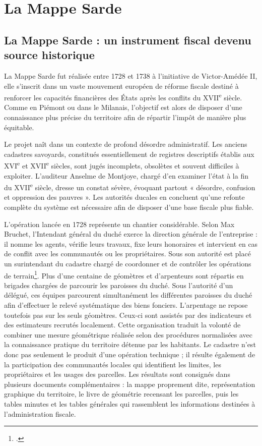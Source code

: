\documentclass[12pt,a4paper]{report}
\begin{document}
\section {La Mappe Sarde}


\subsection{La Mappe Sarde : un instrument fiscal devenu source historique}

La Mappe Sarde fut réalisée entre 1728 et 1738 à l'initiative de Victor-Amédée II, elle s'inscrit dans un vaste mouvement européen de réforme fiscale destiné à renforcer les capacités financières des États après les conflits du XVII\textsuperscript{e} siècle. Comme en Piémont ou dans le Milanais, l'objectif est alors de disposer d'une connaissance plus précise du territoire afin de répartir l'impôt de manière plus équitable.

Le projet naît dans un contexte de profond désordre administratif. Les anciens cadastres savoyards, constitués essentiellement de registres descriptifs établis aux XVI\textsuperscript{e} et XVII\textsuperscript{e} siècles, sont jugés incomplets, obsolètes et souvent difficiles à exploiter. L'auditeur Anselme de Montjoye, chargé d'en examiner l'état à la fin du XVII\textsuperscript{e} siècle, dresse un constat sévère, évoquant partout « désordre, confusion et oppression des pauvres ». Les autorités ducales en concluent qu'une refonte complète du système est nécessaire afin de disposer d'une base fiscale plus fiable.

L'opération lancée en 1728 représente un chantier considérable. Selon Max Bruchet, l'Intendant général du duché exerce la direction générale de l'entreprise : il nomme les agents, vérifie leurs travaux, fixe leurs honoraires et intervient en cas de conflit avec les communautés ou les propriétaires. Sous son autorité est placé un surintendant du cadastre chargé de coordonner et de contrôler les opérations de terrain\footcite{Bruchet1908Abolition}. Plus d'une centaine de géomètres et d'arpenteurs sont répartis en brigades chargées de parcourir les paroisses du duché. Sous l'autorité d'un délégué, ces équipes parcourent simultanément les différentes paroisses du duché afin d'effectuer le relevé systématique des biens fonciers. L'arpentage ne repose toutefois pas sur les seuls géomètres. Ceux-ci sont assistés par des indicateurs et des estimateurs recrutés localement. Cette organisation traduit la volonté de combiner une mesure géométrique réalisée selon des procédures normalisées avec la connaissance pratique du territoire détenue par les habitants. Le cadastre n'est donc pas seulement le produit d'une opération technique ; il résulte également de la participation des communautés locales qui identifient les limites, les propriétaires et les usages des parcelles. Les résultats sont consignés dans plusieurs documents complémentaires : la mappe proprement dite, représentation graphique du territoire, le livre de géométrie recensant les parcelles, puis les tables minutes et les tables générales qui rassemblent les informations destinées à l'administration fiscale.
\end{document}

